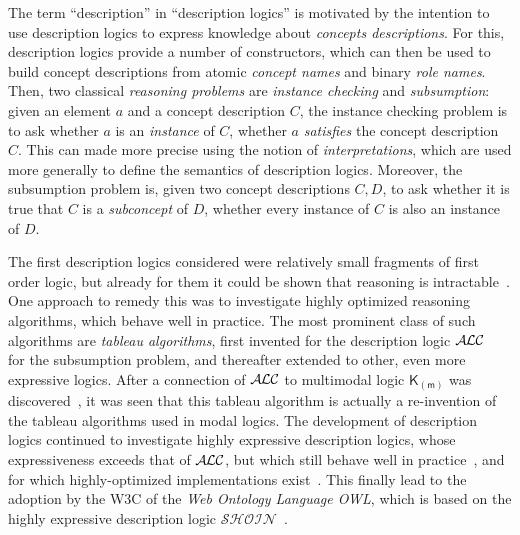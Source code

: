 The term \enquote{description} in \enquote{description logics} is motivated by the
intention to use description logics to express knowledge about \emph{concepts
  descriptions}.  For this, description logics provide a number of constructors, which can
then be used to build concept descriptions from atomic \emph{concept names} and binary
\emph{role names}.  Then, two classical \emph{reasoning problems} are \emph{instance
  checking} and \emph{subsumption}: given an element $a$ and a concept description $C$,
the instance checking problem is to ask whether $a$ is an \emph{instance} of $C$, \ie
whether $a$ \emph{satisfies} the concept description $C$.  This can made more precise
using the notion of \emph{interpretations}, which are used more generally to define the
semantics of description logics.  Moreover, the subsumption problem is, given two concept
descriptions $C, D$, to ask whether it is true that $C$ is a \emph{subconcept} of $D$, \ie
whether every instance of $C$ is also an instance of $D$.

The first description logics considered were relatively small fragments of first order
logic, but already for them it could be shown that reasoning is
intractable~\cite{conf/aaai/BrachmanL84,journals/ai/Nebel88}.  One approach to remedy this
was to investigate highly optimized reasoning algorithms, which behave well in practice.
The most prominent class of such algorithms are \emph{tableau algorithms}, first invented
for the description logic
$\mathcal{A}\kern-0.05em\mathcal{L}\mathcal{C}$~\cite{journals/ai/Schmidt-SchaussS91,conf/ecai/HollunderNS90} for the subsumption
problem, and thereafter extended to other, even more expressive logics.  After a
connection of $\mathcal{A}\kern-0.05em\mathcal{L}\mathcal{C}$ to multimodal logic $\mathsf{K}_{(\mathsf{m})}$ was
discovered~\cite{DBLP:conf/ijcai/Schild91}, it was seen that this tableau algorithm is
actually a re-invention of the tableau algorithms used in modal logics.  The development
of description logics continued to investigate highly expressive description logics, whose
expressiveness exceeds that of $\mathcal{A}\kern-0.05em\mathcal{L}\mathcal{C}$, but which still behave well in
practice~\cite{journals/igpl/HorrocksST00}, and for which highly-optimized implementations
exist~\cite{sirin_pellet:practical_2007,Haarslev:2001,DBLP:conf/cade/TsarkovH06}.  This
finally lead to the adoption by the W3C of the \emph{Web Ontology Language OWL}, which is
based on the highly expressive description logic
$\mathcal{S}\mathcal{H}\mathcal{O}\mathcal{I}\mathcal{N}$~\cite{horrocks03fromshiqrdftoowl}.

